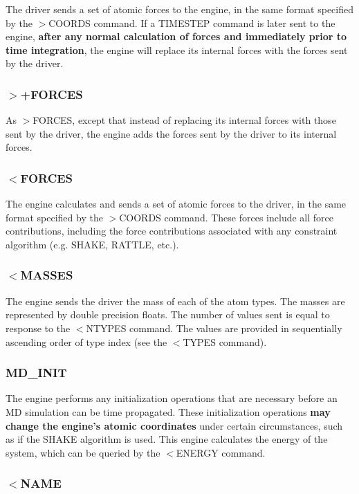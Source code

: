 The driver sends a set of atomic forces to the engine, in the same format specified by the {\ttfamily $>$C\-O\-O\-R\-D\-S} command. If a {\ttfamily T\-I\-M\-E\-S\-T\-E\-P} command is later sent to the engine, {\bfseries  after any normal calculation of forces and immediately prior to time integration}, the engine will replace its internal forces with the forces sent by the driver.\hypertarget{index_send_add_forces}{}\subsubsection{$>$+\-F\-O\-R\-C\-E\-S}\label{index_send_add_forces}
As {\ttfamily $>$F\-O\-R\-C\-E\-S}, except that instead of replacing its internal forces with those sent by the driver, the engine adds the forces sent by the driver to its internal forces.\hypertarget{index_recv_forces}{}\subsubsection{$<$\-F\-O\-R\-C\-E\-S}\label{index_recv_forces}
The engine calculates and sends a set of atomic forces to the driver, in the same format specified by the {\ttfamily $>$C\-O\-O\-R\-D\-S} command. These forces include all force contributions, including the force contributions associated with any constraint algorithm (e.\-g. S\-H\-A\-K\-E, R\-A\-T\-T\-L\-E, etc.).\hypertarget{index_recv_masses}{}\subsubsection{$<$\-M\-A\-S\-S\-E\-S}\label{index_recv_masses}
The engine sends the driver the mass of each of the atom types. The masses are represented by double precision floats. The number of values sent is equal to response to the $<$N\-T\-Y\-P\-E\-S command. The values are provided in sequentially ascending order of type index (see the {\ttfamily $<$T\-Y\-P\-E\-S} command).\hypertarget{index_md_init}{}\subsubsection{M\-D\-\_\-\-I\-N\-I\-T}\label{index_md_init}
The engine performs any initialization operations that are necessary before an M\-D simulation can be time propagated. These initialization operations {\bfseries  may change the engine's atomic coordinates } under certain circumstances, such as if the S\-H\-A\-K\-E algorithm is used. This engine calculates the energy of the system, which can be queried by the {\ttfamily $<$E\-N\-E\-R\-G\-Y} command.\hypertarget{index_send_name}{}\subsubsection{$<$\-N\-A\-M\-E}\label{index_send_name}
